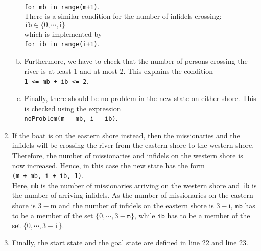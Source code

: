 \begin{enumerate}
\begin{enumerate}[(a)]
            \\[0.2cm]
            \hspace*{1.3cm}
            \texttt{for mb in range(m+1)}.
            \\[0.2cm]
            There is a similar condition for the number of infidels crossing:
            \\[0.2cm]
            \hspace*{1.3cm}
            $\mathtt{ib} \in \{0,\cdots,\mathrm{i}\}$
            \\[0.2cm]
            which is implemented by
            \\[0.2cm]
            \hspace*{1.3cm}
            \texttt{for ib in range(i+1)}.
      \item Furthermore, we have to check that the number of persons crossing the river is at least 1
            and at most 2.  This explains the condition
            \\[0.2cm]
            \hspace*{1.3cm}
            \texttt{1 <= mb + ib <= 2}.
      \item Finally, there should be no problem in the new state on either shore.  This is checked
            using the expression
            \\[0.2cm]
            \hspace*{1.3cm}
            \texttt{noProblem(m - mb, i - ib)}.
      \end{enumerate}
\item If the boat is on the eastern shore instead, then the missionaries and the infidels will be crossing
      the river from the eastern shore to the western shore.  Therefore, the number of missionaries and
      infidels on the western shore is now increased.  Hence, in this case the new state has the form
      \\[0.2cm]
      \hspace*{1.3cm}
      \texttt{(m + mb, i + ib, 1)}.
      \\[0.2cm]
      Here, \texttt{mb} is the number of missionaries arriving on the western shore and \texttt{ib} is the
      number of arriving infidels.
      As the number of missionaries on the eastern shore is $3 - \mathrm{m}$ and the number of infidels on the
      eastern shore is $3 - \mathrm{i}$, $\texttt{mb}$ has to be a member of the set $\{0,\cdots,3 -\mathtt{m}\}$, while
      $\texttt{ib}$ has to be a member of the set $\{0,\cdots,3 - \mathtt{i}\}$.
\item Finally, the start state and the goal state are defined in line 22 and line 23.
\end{enumerate}
